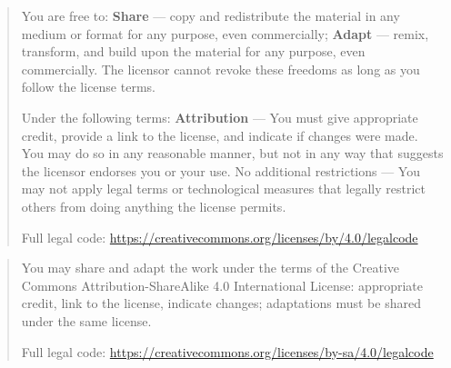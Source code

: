\expandafter\def\csname qdissertation@licensetext@CC-BY-4.0\endcsname{%
  \begin{quote}\small\raggedright
    You are free to: \textbf{Share} --- copy and redistribute the material in any medium or format for any purpose, even commercially; \textbf{Adapt} --- remix, transform, and build upon the material for any purpose, even commercially. The licensor cannot revoke these freedoms as long as you follow the license terms.

    Under the following terms: \textbf{Attribution} --- You must give appropriate credit, provide a link to the license, and indicate if changes were made. You may do so in any reasonable manner, but not in any way that suggests the licensor endorses you or your use. No additional restrictions --- You may not apply legal terms or technological measures that legally restrict others from doing anything the license permits.

    Full legal code: \url{https://creativecommons.org/licenses/by/4.0/legalcode}
  \end{quote}%
}

\expandafter\def\csname qdissertation@licensetext@CC-BY-SA-4.0\endcsname{%
  \begin{quote}\small\raggedright
    You may share and adapt the work under the terms of the Creative Commons Attribution-ShareAlike 4.0 International License: appropriate credit, link to the license, indicate changes; adaptations must be shared under the same license.

    Full legal code: \url{https://creativecommons.org/licenses/by-sa/4.0/legalcode}
  \end{quote}%
}

